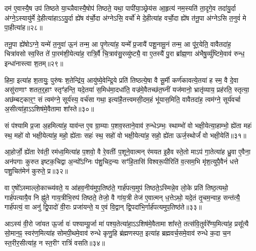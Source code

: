 दम॑ ए॒वास्यै॒ष उप॑ तिष्ठते या॒च्ञैवास्यै॒षोप॑ तिष्ठते॒ यथा॒ पापी॑या॒ञ्छ्रेय॑स आ॒हृत्य॑ नम॒स्यति॑ ता॒दृगे॒व तदा॑यु॒र्दा अ॑ग्ने॒\-ऽस्यायु॑र्मे दे॒हीत्या॑हा\-ऽ\-ऽयु॒र्दा ह्ये॑ष व॑र्चो॒दा अ॑ग्ने\-ऽसि॒ वर्चो॑ मे दे॒हीत्या॑ह वर्चो॒दा ह्ये॑ष त॑नू॒पा अ॑ग्ने\-ऽसि त॒नुवं॑ मे पा॒हीत्या॑ह॥२८॥

तनू॒पा ह्ये॑षो\-ऽग्ने॒ यन्मे॑ त॒नुवा॑ ऊ॒नं तन्म॒ आ पृ॒णेत्या॑ह॒ यन्मे᳚ प्र॒जायै॑ पशू॒नामू॒नं तन्म॒ आ पू॑र॒येति॒ वावैतदा॑ह॒ चित्रा॑वसो स्व॒स्ति ते॑ पा॒रम॑शी॒येत्या॑ह॒ रात्रि॒र्वै चि॒त्राव॑सु॒रव्यु॑ष्ट्यै॒ वा ए॒तस्यै॑ पु॒रा ब्रा᳚ह्म॒णा अ॑भैषु॒र्व्यु॑ष्टिमे॒वाव॑ रुन्ध॒ इन्धा॑नास्त्वा श॒तम्॥२९॥

हिमा॒ इत्या॑ह श॒तायुः॒ पुरु॑षः श॒तेन्द्रि॑य॒ आयु॑ष्ये॒वेन्द्रि॒ये प्रति॑ तिष्ठत्ये॒षा वै सू॒र्मी कर्ण॑कावत्ये॒तया॑ ह स्म॒ वै दे॒वा असु॑राणाꣳ शतत॒र्॒\mbox{}हाꣳ स्तृꣳ॑हन्ति॒ यदे॒तया॑ स॒मिध॑मा॒दधा॑ति॒ वज्र॑मे॒वैतच्छ॑त॒घ्नीं यज॑मानो॒ भ्रातृ॑व्याय॒ प्रह॑रति॒ स्तृत्या॒ अछ॑म्बट्कार॒ꣳ॒ सं त्वम॑ग्ने॒ सूर्य॑स्य॒ वर्च॑सा गथा॒ इत्या॑है॒तत्त्वमसी॒दम॒हं भू॑यास॒मिति॒ वावैतदा॑ह॒ त्वम॑ग्ने॒ सूर्य॑वर्चा अ॒सीत्या॑हा॒\-ऽ\-ऽशिष॑मे॒वैतामा शा᳚स्ते॥३०॥

{\anuvakamend[{मू॒र्धानं॒ वै तिष्ठ॑त आह श॒तम॒हꣳ षोड॑श च॥७॥}]}

सं प॑श्यामि प्र॒जा अ॒हमित्या॑ह॒ याव॑न्त ए॒व ग्रा॒म्याः प॒शव॒स्ताने॒वाव॑ रु॒न्धे\-ऽम्भः॒ स्थाम्भो॑ वो भक्षी॒येत्या॒हाम्भो॒ ह्ये॑ता महः॑ स्थ॒ महो॑ वो भक्षी॒येत्या॑ह॒ महो॒ ह्ये॑ताः सहः॑ स्थ॒ सहो॑ वो भक्षी॒येत्या॑ह॒ सहो॒ ह्ये॑ता ऊर्ज॒स्थोर्जं॑ वो भक्षी॒येति॑॥३१॥

आ॒होर्जो॒ ह्ये॑ता रेव॑ती॒ रम॑ध्व॒मित्या॑ह प॒शवो॒ वै रे॒वतीः᳚ प॒शूने॒वात्मन् र॑मयत इ॒हैव स्ते॒तो मा\-ऽप॑ गा॒तेत्या॑ह ध्रु॒वा ए॒वैना॒ अन॑पगाः कुरुत इष्टक॒चिद्वा अ॒न्यो᳚\-ऽग्निः प॑शु॒चिद॒न्यः सꣳ॑हि॒तासि॑ विश्वरू॒पीरिति॑ व॒त्सम॒भि मृ॑श॒त्युपै॒वैनं॑ धत्ते पशु॒चित॑मेनं कुरुते॒ प्र॥३२॥

वा ए॒षो᳚\-ऽस्माल्लो॒काच्च्य॑वते॒ य आ॑हव॒नीय॑मुप॒तिष्ठ॑ते॒ गार्\mbox{}ह॑पत्य॒मुप॑ तिष्ठते॒\-ऽस्मिन्ने॒व लो॒के प्रति॑ तिष्ठ॒त्यथो॒ गार्\mbox{}ह॑पत्यायै॒व नि ह्नु॑ते गाय॒त्रीभि॒रुप॑ तिष्ठते॒ तेजो॒ वै गा॑य॒त्री तेज॑ ए॒वात्मन् ध॒त्ते\-ऽथो॒ यदे॒तं तृ॒चम॒न्वाह॒ सन्त॑त्यै॒ गार्\mbox{}ह॑पत्यं॒ वा अनु॑ द्वि॒पादो॑ वी॒राः प्रजा॑यन्ते॒ य ए॒वं वि॒द्वान् द्वि॒पदा॑भि॒र्गार्\mbox{}ह॑पत्यमुप॒तिष्ठ॑ते॥३३॥

आ\-ऽस्य॑ वी॒रो जा॑यत ऊ॒र्जा वः॑ पश्याम्यू॒र्जा मा॑ पश्य॒तेत्या॑हा॒\-ऽ\-ऽशिष॑मे॒वैतामा शा᳚स्ते॒ तत्स॑वि॒तुर्वरे᳚ण्य॒मित्या॑ह॒ प्रसू᳚त्यै सो॒मान॒ꣴ॒ स्वर॑ण॒मित्या॑ह सोमपी॒थमे॒वाव॑ रुन्धे कृणु॒हि ब्र॑ह्मणस्पत॒ इत्या॑ह ब्रह्मवर्च॒समे॒वाव॑ रुन्धे क॒दा च॒न स्त॒रीर॒सीत्या॑ह॒ न स्त॒रीꣳ रात्रिं॑ वसति॥३४॥

